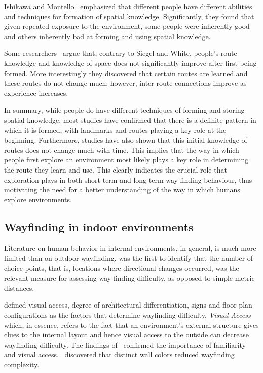  Ishikawa and Montello~\cite{Ishikawa200693} emphasized that different people have different abilities and techniques for formation of spatial knowledge. Significantly, they found that given repeated exposure to the environment, some people were inherently good and others inherently bad at forming and using spatial knowledge.

 Some researchers~\cite{Moeser01011988,Ishikawa200693} argue that, contrary to Siegel and White, people's route knowledge and knowledge of space does not significantly improve after first being formed. More interestingly they discovered that certain routes are learned and these routes do not change much; however, inter route connections improve as experience increases.

 In summary, while people do have different techniques of forming and storing spatial knowledge, most studies have confirmed that there is a definite pattern in which it is formed, with landmarks and routes playing a key role at the beginning. Furthermore, studies have also shown that this initial knowledge of routes does not change much with time. This implies that the way in which people first explore an environment most likely plays a key role in determining the route they learn and use. This clearly indicates the crucial role that exploration plays in both short-term and long-term way finding behaviour, thus motivating the need for a better understanding of the way in which humans explore environments.

\subsection{Wayfinding in indoor environments} %
\label{sec:indoor_wayfinding}

Literature on human behavior in internal environments, in general, is much more limited than on outdoor wayfinding. \cite{best1970direction} was the first to identify that the number of choice points, that is, locations where directional changes occurred, was the relevant measure for assessing way finding difficulty, as opposed to simple metric distances.


\cite{Weisman01031981} defined visual access, degree of architectural differentiation, signs and floor plan configurations as the factors that determine wayfinding difficulty. \emph{Visual Access} which, in essence, refers to the fact that an environment's external structure gives clues to the internal layout and hence visual access to the outside can decrease wayfinding difficulty.  The findings of~\cite{garling1983orientation} confirmed the importance of familiarity and visual access.~\cite{evans1980cognitive} discovered that distinct wall colors reduced wayfinding complexity.

